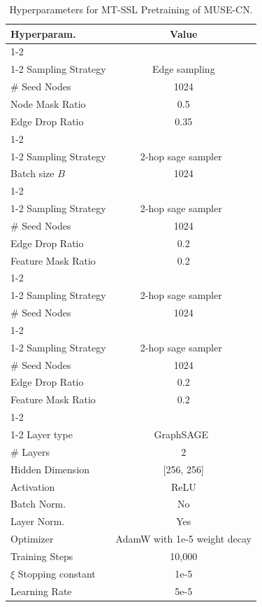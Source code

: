 \documentclass{article}
\newcommand{\featrec}{\texttt{FeatRec}\xspace}
\newcommand{\toporec}{\texttt{TopoRec}\xspace}
\newcommand{\repdecor}{\texttt{RepDecor}\xspace}
\newcommand{\ming}{\texttt{MI-NG}\xspace}
\newcommand{\minsg}{\texttt{MI-NSG}\xspace}
\begin{document}
\begin{table}[H]
    \tiny
    \centering
    \caption{Hyperparameters for MT-SSL Pretraining of MUSE-CN.}
    \label{tab:SSL_hyperparameters}
    \begin{tabular}{l|c}
    \toprule 
    Hyperparam. & Value \\
    \cmidrule(r){1-2} 
    \multicolumn{2}{c}{\featrec}\\
    \cmidrule(r){1-2} 
    Sampling Strategy & Edge sampling \\
    \# Seed Nodes     & 1024 \\
    Node Mask Ratio   & 0.5 \\
    Edge Drop Ratio   & 0.35 \\
    \cmidrule(r){1-2} 
    \multicolumn{2}{c}{\toporec}\\
    \cmidrule(r){1-2} 
    Sampling Strategy & $2$-hop sage sampler~\cite{hamilton2017inductive} \\
    Batch size $B$    & 1024 \\
    \cmidrule(r){1-2} 
    \multicolumn{2}{c}{\repdecor}\\
    \cmidrule(r){1-2} 
    Sampling Strategy & 2-hop sage sampler~\cite{hamilton2017inductive} \\
    \# Seed Nodes     & 1024 \\
    Edge Drop Ratio   & 0.2 \\
    Feature Mask Ratio& 0.2 \\
    \cmidrule(r){1-2} 
    \multicolumn{2}{c}{\ming}\\
    \cmidrule(r){1-2} 
    Sampling Strategy & 2-hop sage sampler~\cite{hamilton2017inductive} \\
    \# Seed Nodes     & 1024 \\
    \cmidrule(r){1-2} 
    \multicolumn{2}{c}{\minsg}\\
    \cmidrule(r){1-2} 
    Sampling Strategy & 2-hop sage sampler~\cite{hamilton2017inductive} \\
    \# Seed Nodes     & 1024 \\
    Edge Drop Ratio   & 0.2 \\
    Feature Mask Ratio& 0.2 \\
    \cmidrule(r){1-2} 
    \multicolumn{2}{c}{GNN encoder}\\
    \cmidrule(r){1-2} 
    Layer type        & GraphSAGE~\cite{hamilton2017inductive} \\
    \# Layers         & 2 \\
    Hidden Dimension  & [256, 256] \\
    Activation        & ReLU \\
    Batch Norm.       & No \\
    Layer Norm.       & Yes \\
    Optimizer         & AdamW with 1e-5 weight decay \\
    Training Steps    & 10,000 \\
    $\xi$ Stopping constant & 1e-5 \\
    Learning Rate     & 5e-5 \\
    \bottomrule 
    \end{tabular}
\end{table}
\end{document}
